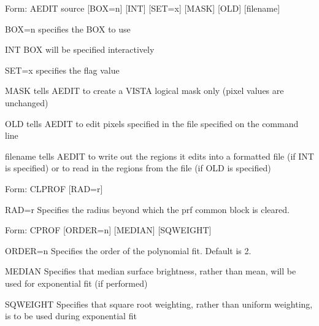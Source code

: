 {\newpage\clearpage
{}%
\begin{command}
  \item[Form: AEDIT source {[BOX=n]} {[INT]} {[SET=x]} {[MASK]} {[OLD]} 
       {[filename]}\hfill]{}
  \item[BOX=n]{specifies the BOX to use}
  \item[INT]{BOX will be specified interactively}
  \item[SET=x]{specifies the flag value}
  \item[MASK]{tells AEDIT to create a VISTA logical mask only (pixel values
       are unchanged)}
  \item[OLD]{tells AEDIT to edit pixels specified in the file specified on
       the command line}
  \item[filename]{tells AEDIT to write out the regions it edits into a
       formatted file (if INT is specified) or to read in the regions from
       the file (if OLD is specified)}
\end{command}%
\lthtmlfigureZ
\lthtmlcheckvsize\clearpage}

{\newpage\clearpage
{}%
\begin{command}
  \item[Form: CLPROF {[RAD=r]}\hfill]{}
  \item[RAD=r]{Specifies the radius beyond which the prf common
       block is cleared.}
\end{command}%
\lthtmlfigureZ
\lthtmlcheckvsize\clearpage}

{\newpage\clearpage
{}%
\begin{command}
  \item[Form: CPROF {[ORDER=n]} {[MEDIAN]} {[SQWEIGHT]}\hfill]{}
  \item[ORDER=n]{Specifies the order of the polynomial fit. Default is 2.}
  \item[MEDIAN]{Specifies that median surface brightness, rather
       than mean, will be used for exponential fit (if performed)}
  \item[SQWEIGHT]{Specifies that square root weighting, rather than 
       uniform weighting, is to be used during exponential fit}
\end{command}%
\lthtmlfigureZ
\lthtmlcheckvsize\clearpage}

